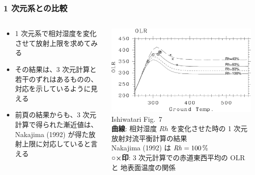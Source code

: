 \documentclass[aspectratio=149,9pt,]{beamer}
\newcommand{\hmemph}[1]{\textbf{#1}}
\begin{document}
\begin{frame}
	\frametitle{1 次元系との比較}
	\begin{columns}[T,onlytextwidth]
		\begin{column}{.4\textwidth}
			\begin{itemize}
				\item 1 次元系で相対湿度を変化させて放射上限を求めてみる
				\item その結果は、3 次元計算と若干のずれはあるものの、対応を示しているように見える
				\item 前頁の結果からも、3 次元計算で得られた漸近値は、Nakajima \etal (1992)
					が得た放射上限に対応していると言える
			\end{itemize}
		\end{column}
		\begin{column}{.6\textwidth}
			\centering\scriptsize
			\includegraphics[width=.8\textwidth]{./fig/Tg-OLR-1dimL99-3dEq-crop.pdf}\\
			Ishiwatari \etal Fig.~7\\
			\hmemph{曲線}: 相対湿度 \(\mathit{Rh}\) を変化させた時の 1 次元放射対流平衡計算の結果\\
			Nakajima \etal (1992) は \(\mathit{Rh}=100\hmu{\%}\)\\
			\hmemph{○×印}: 3 次元計算での赤道東西平均の OLR と 地表面温度の関係
		\end{column}
	\end{columns}
\end{frame}

\end{document}
